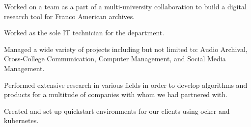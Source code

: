 \documentclass[letterpaper]{resume_AMcEnaney} %
\begin{document}
\begin{minipage}[t]{0.66\textwidth}
        \sectionspace %




        \begin{tightitemize}
            \item Worked on a team as a part of a multi-university collaboration to build a digital research tool for Franco American archives.
            \item Worked as the sole IT technician for the department.
            \item Managed a wide variety of projects including but not limited to: Audio Archival, Cross-College Communication, Computer Management, and Social Media Management.
        \end{tightitemize}

        \sectionspace %



        \begin{tightitemize}
            \item Performed extensive research in various fields in order to develop algorithms and products for a multitude of companies with whom we had partnered with.
            \item Created and set up quickstart environments for our clients using ocker and kubernetes.
        \end{tightitemize}

        \sectionspace %
        


\end{minipage} %
\end{document}
